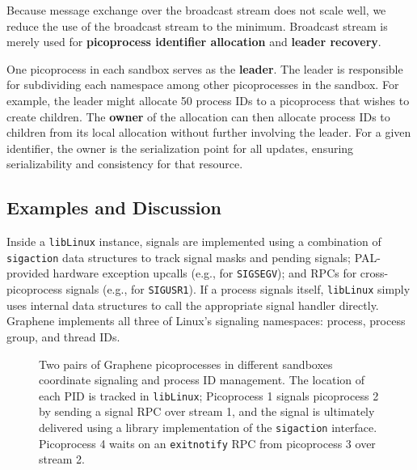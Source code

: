 Because message exchange over the broadcast stream does not scale well,
we reduce the use of the broadcast stream to the minimum.
Broadcast stream is merely used for {\bf picoprocess identifier allocation}
and {\bf leader recovery}.

One picoprocess in each sandbox serves as the {\bf leader}.
The leader is responsible for subdividing each namespace among other picoprocesses 
in the sandbox.
For example, the leader might allocate 50 process IDs to a picoprocess
that wishes to create children.  The {\bf owner} of the allocation can then allocate process IDs
to children from its local allocation without further involving the leader.
For a given identifier, the owner is the serialization point for all updates,
ensuring serializability and consistency for that resource.

\subsection{Examples and Discussion}

 Inside a {\tt libLinux} instance, signals are implemented using a combination of 
{\tt sigaction} data structures %
to track signal masks and pending signals;
PAL-provided hardware exception upcalls (e.g., for {\tt SIGSEGV});
and  RPCs for cross-picoprocess signals (e.g., for  {\tt SIGUSR1}).
If a process signals itself, {\tt libLinux} simply uses internal data structures
to call the appropriate signal handler directly.
Graphene implements all three of Linux's signaling namespaces:
process, process group, and thread IDs.

\begin{figure}
\centering
\caption{Two pairs of Graphene picoprocesses in different sandboxes 
  coordinate signaling and process ID management.
  The location of each PID is tracked in {\tt libLinux}; Picoprocess 1 signals
  picoprocess 2 by sending a signal RPC over stream 1,
  and the signal is ultimately delivered using a 
  library implementation of the {\tt sigaction} interface. Picoprocess 4 
  waits on an {\tt exitnotify} RPC from  picoprocess 3 over stream 2. 
}
\label{fig:coordination}
\end{figure}

